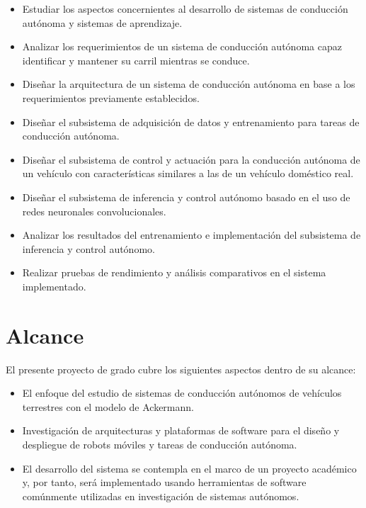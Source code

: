 \documentclass[12pt,letterpaper]{article}
\begin{document}
\begin{itemize}

    \item Estudiar los aspectos concernientes al desarrollo de sistemas de conducción autónoma y sistemas de aprendizaje.
    \item Analizar los requerimientos de un sistema de conducción autónoma capaz identificar y mantener su carril mientras se conduce.
    \item Diseñar la arquitectura de un sistema de conducción autónoma en base a los requerimientos previamente establecidos.
    \item Diseñar el subsistema de adquisición de datos y entrenamiento para tareas de conducción autónoma.
    \item Diseñar el subsistema de control y actuación para la conducción autónoma de un vehículo con características similares a las de un vehículo doméstico real.
    \item Diseñar el subsistema de inferencia y control autónomo basado en el uso de redes neuronales convolucionales.
    \item Analizar los resultados del entrenamiento e implementación del subsistema de inferencia y control autónomo.
    \item Realizar pruebas de rendimiento y análisis comparativos en el sistema implementado.

\end{itemize}


\section{Alcance}

El presente proyecto de grado cubre los siguientes aspectos dentro de su alcance:

\begin{itemize}
    \item El enfoque del estudio de sistemas de conducción autónomos de vehículos terrestres con el modelo de Ackermann.
    \item Investigación de arquitecturas y plataformas de software para el
    diseño y despliegue de robots móviles y tareas de conducción autónoma.
    \item El desarrollo del sistema se contempla en el marco de un proyecto académico 
    y, por tanto, será implementado usando herramientas de software comúnmente utilizadas en 
    investigación de sistemas autónomos.
\end{itemize}
\end{document}

